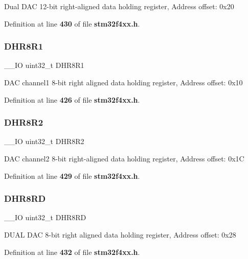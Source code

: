 Dual D\+AC 12-\/bit right-\/aligned data holding register, Address offset\+: 0x20 

Definition at line \textbf{ 430} of file \textbf{ stm32f4xx.\+h}.

\mbox{\label{structDAC__TypeDef_ad0a200e12acad17a5c7d2059159ea7e1}} 
\subsubsection{D\+H\+R8\+R1}
{\footnotesize\ttfamily \+\_\+\+\_\+\+IO uint32\+\_\+t D\+H\+R8\+R1}

D\+AC channel1 8-\/bit right aligned data holding register, Address offset\+: 0x10 

Definition at line \textbf{ 426} of file \textbf{ stm32f4xx.\+h}.

\mbox{\label{structDAC__TypeDef_a4c435f0e34ace4421241cd5c3ae87fc2}} 
\subsubsection{D\+H\+R8\+R2}
{\footnotesize\ttfamily \+\_\+\+\_\+\+IO uint32\+\_\+t D\+H\+R8\+R2}

D\+AC channel2 8-\/bit right-\/aligned data holding register, Address offset\+: 0x1C 

Definition at line \textbf{ 429} of file \textbf{ stm32f4xx.\+h}.

\mbox{\label{structDAC__TypeDef_a9590269cba8412f1be96b0ddb846ef44}} 
\subsubsection{D\+H\+R8\+RD}
{\footnotesize\ttfamily \+\_\+\+\_\+\+IO uint32\+\_\+t D\+H\+R8\+RD}

D\+U\+AL D\+AC 8-\/bit right aligned data holding register, Address offset\+: 0x28 

Definition at line \textbf{ 432} of file \textbf{ stm32f4xx.\+h}.

\mbox{\label{structDAC__TypeDef_aa710505be03a41981c35bacc7ce20746}} 
